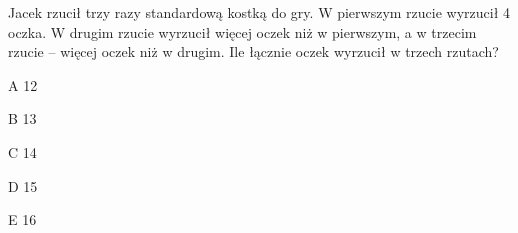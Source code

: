 \begin{tresc}
Jacek rzucił trzy razy standardową kostką do gry. W pierwszym rzucie wyrzucił 4 oczka. W drugim rzucie wyrzucił więcej oczek niż w pierwszym, a w trzecim rzucie – więcej oczek niż w drugim. Ile łącznie oczek wyrzucił w trzech rzutach?
\end{tresc}
\begin{wariant}{A} 12 \end{wariant}
\begin{wariant}{B} 13 \end{wariant}
\begin{wariant}{C} 14 \end{wariant}
\begin{wariant}{D} 15 \end{wariant}
\begin{wariant}{E} 16 \end{wariant}
